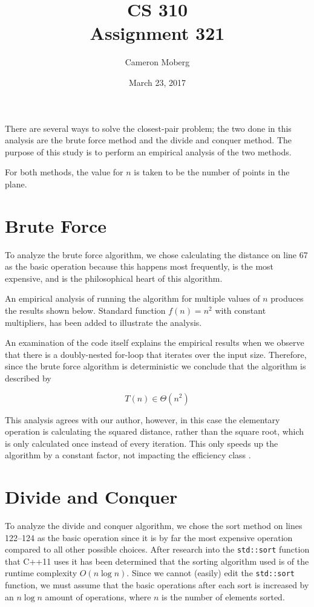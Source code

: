 \documentclass[11pt]{article}
\begin{document}
\thispagestyle{empty}
\title{CS 310 \\
\large Assignment 321}
\date{March 23, 2017}
\author{Cameron Moberg}
\maketitle

There are several ways to solve the closest-pair problem; the two done in this analysis are the brute force method and the divide and conquer method. The purpose of this study is to perform an empirical analysis of the two methods.

For both methods, the value for $n$ is taken to be the number of points in the plane.

\section{Brute Force}
To analyze the brute force algorithm, we chose calculating the distance on line 67 as the basic operation because this happens most frequently, is the most expensive, and is the philosophical heart of this algorithm.

An empirical analysis of running the algorithm for multiple values of
$n$ produces the results shown below. Standard function $f(n) = n^2$ with constant multipliers, has been added to
illustrate the analysis.

\begin{center}
    
\end{center}

An examination of the code itself explains the empirical results when we observe that there is a doubly-nested for-loop that iterates over the input size. Therefore, since the brute force algorithm is deterministic we conclude that the algorithm is described by

\[
T(n) \in \Theta( n^{2} )
\]

This analysis agrees with our author, however, in this case the elementary operation is calculating the squared distance, rather than the square root, which is only calculated once instead of every iteration. This only speeds up the algorithm by a constant factor, not impacting the efficiency class \cite{levit}.

\section{Divide and Conquer}
To analyze the divide and conquer algorithm, we chose the sort method on lines 122--124 as the basic operation since it is by far the most expensive operation compared to all other possible choices. After research into the \texttt{std::sort} function that C++11 uses it has been determined that the sorting algorithm used is of the runtime complexity $O(n\log n)$\cite{cplus}. Since we cannot (easily) edit the \texttt{std::sort} function, we must assume that the basic operations after each sort is increased by an $n\log n$ amount of operations, where $n$ is the number of elements sorted.
\end{document}
